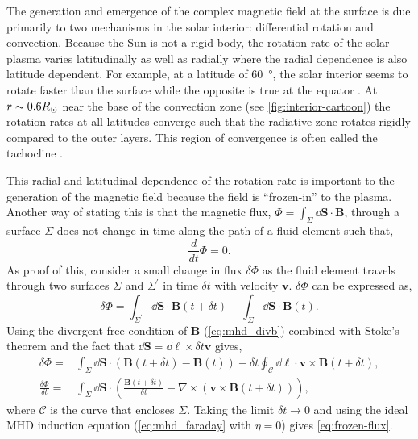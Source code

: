 The generation and emergence of the complex magnetic field at the surface is due primarily to two mechanisms in the solar interior: differential rotation and convection. Because the Sun is not a rigid body, the rotation rate of the solar plasma varies latitudinally as well as radially where the radial dependence is also latitude dependent. For example, at a latitude of \SI{60}{\degree}, the solar interior seems to rotate faster than the surface while the opposite is true at the equator \citep{thompson_differential_1996}. At $r\sim0.6R_\odot$ near the base of the convection zone (see \autoref{fig:interior-cartoon}) the rotation rates at all latitudes converge \citep{golub_solar_2010} such that the radiative zone rotates rigidly compared to the outer layers. This region of convergence is often called the tachocline \citep{aschwanden_physics_2006}.

This radial and latitudinal dependence of the rotation rate is important to the generation of the magnetic field because the field is ``frozen-in'' to the plasma. Another way of stating this is that the magnetic flux, $\Phi=\int_\Sigma\dd{\mathbf{S}}\cdot\mathbf{B}$, through a surface $\Sigma$ does not change in time along the path of a fluid element such that,
\begin{equation}\label{eq:frozen-flux}
    \frac{d}{dt}\Phi = 0.
\end{equation}
As proof of this, consider a small change in flux $\delta\Phi$ as the fluid element travels through two surfaces $\Sigma$ and $\Sigma^\prime$ in time $\delta t$ with velocity $\mathbf{v}$. $\delta\Phi$ can be expressed as,
\begin{equation*}
    \delta\Phi = \int_{\Sigma^\prime}\dd{\mathbf{S}}\cdot\mathbf{B}(t+\delta t) - \int_\Sigma\dd{\mathbf{S}}\cdot\mathbf{B}(t).
\end{equation*}
Using the divergent-free condition of $\mathbf{B}$ (\autoref{eq:mhd_divb}) combined with Stoke's theorem and the fact that $\dd{\mathbf{S}}=\dd{\bm{\ell}}\times\delta t\mathbf{v}$ gives,
\begin{align}
    \delta\Phi =& \int_\Sigma\dd{\mathbf{S}}\cdot(\mathbf{B}(t+\delta t) - \mathbf{B}(t)) - \delta t\oint_\mathcal{C}\dd{\bm{\ell}}\cdot\mathbf{v}\times\mathbf{B}(t + \delta t), \nonumber\\
    \frac{\delta\Phi}{\delta t} =& \int_\Sigma\dd{\mathbf{S}}\cdot\left( \frac{\mathbf{B}(t+\delta t)}{\delta t} - \nabla\times(\mathbf{v}\times\mathbf{B}(t + \delta t)) \right),\nonumber
\end{align}
where $\mathcal{C}$ is the curve that encloses $\Sigma$. Taking the limit $\delta t\to0$ and using the ideal MHD induction equation (\autoref{eq:mhd_faraday} with $\eta=0$) gives \autoref{eq:frozen-flux}.

